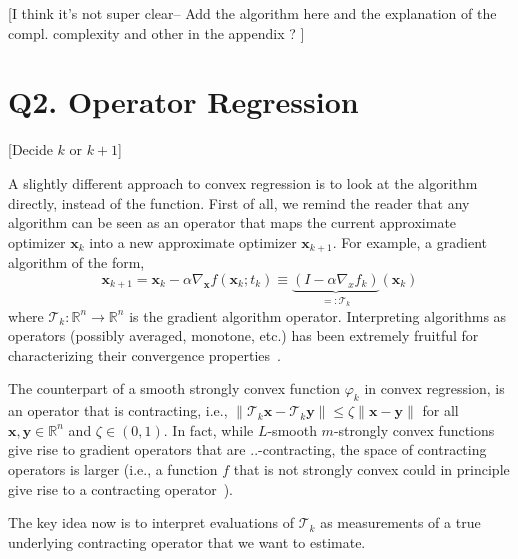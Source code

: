 \documentclass{article}
\newcommand{\R}{\mathbb{R}}
\newcommand{\x}{\mathbold{x}}
\newcommand{\y}{\mathbold{y}}
\newcommand{\T}{\mathcal{T}}
\newcommand{\andrea}[1]{{\color{red}[#1]}}
\begin{document}
\andrea{I think it's not super clear-- Add the algorithm here and the explanation of the compl. complexity and other in the appendix ? }





\section{Q2. Operator Regression}\label{sec:opreg}

\andrea{Decide $k$ or $k+1$}

A slightly different approach to convex regression is to look at the algorithm directly, instead of the function. First of all, we remind the reader that any algorithm can be seen as an operator that maps the current approximate optimizer $\x_k$ into a new approximate optimizer $\x_{k+1}$. For example, a gradient algorithm of the form,
\begin{equation}
\x_{k+1} = \x_k - \alpha \nabla_{\x} f(\x_k; t_k) \equiv \underbrace{(I - \alpha \nabla_{x}f_k)}_{=:\T_k} (\x_k)
\end{equation}
where $\T_k: \R^n \to \R^n$ is the gradient algorithm operator. Interpreting algorithms as operators (possibly averaged, monotone, etc.) has been extremely fruitful for characterizing their convergence properties~\cite{Rockafellar1976, Eckstein1989, bauschke_convex_2017,Ryu2015,Sherson2018}.

The counterpart of a smooth strongly convex function $\varphi_k$ in convex regression, is an operator that is contracting, i.e., $\|\T_k \x - \T_k \y\| \leq \zeta \|\x - \y\|$ for all $\x, \y \in \R^n$ and $\zeta \in (0,1)$. In fact, while $L$-smooth $m$-strongly convex functions give rise to gradient operators that are $..$-contracting, the space of contracting operators is larger (i.e., a function $f$ that is not strongly convex could in principle give rise to a contracting operator~\cite{linear}). 

The key idea now is to interpret evaluations of $\T_k$ as measurements of a true underlying contracting operator that we want to estimate. 
 
\end{document}
